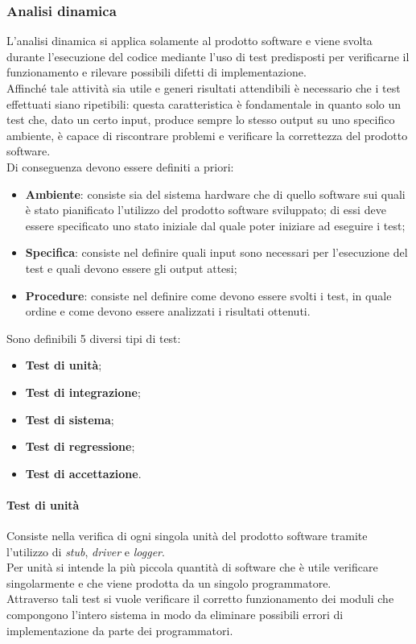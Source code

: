 \subsubsection{Analisi dinamica}
L'analisi dinamica si applica solamente al prodotto software e viene svolta durante l'esecuzione del codice mediante l'uso di test predisposti per verificarne il funzionamento e rilevare possibili difetti di implementazione.\\
Affinché tale attività sia utile e generi risultati attendibili è necessario che i test effettuati siano ripetibili: questa caratteristica è fondamentale in quanto solo un test che, dato un certo input, produce sempre lo stesso output su uno specifico ambiente, è capace di riscontrare problemi e verificare la correttezza del prodotto software.\\
Di conseguenza devono essere definiti a priori:
\begin{itemize}
\item \textbf{Ambiente}: consiste sia del sistema hardware che di quello software sui quali è stato pianificato l'utilizzo del prodotto software sviluppato; di essi deve essere specificato uno stato iniziale dal quale poter iniziare ad eseguire i test;
\item \textbf{Specifica}: consiste nel definire quali input sono necessari per l'esecuzione del test e quali devono essere gli output attesi;
\item \textbf{Procedure}: consiste nel definire come devono essere svolti i test, in quale ordine e come devono essere analizzati i risultati ottenuti.
\end{itemize}
Sono definibili 5 diversi tipi di test: 
\begin{itemize}
\item \textbf{Test di unità};
\item \textbf{Test di integrazione};
\item \textbf{Test di sistema};
\item \textbf{Test di regressione};
\item \textbf{Test di accettazione}.  
\end{itemize}

\paragraph{Test di unità}
Consiste nella verifica di ogni singola unità del prodotto software tramite l'utilizzo di \textit{stub}, \textit{driver} e \textit{logger}.\\
Per unità si intende la più piccola quantità di software che è utile verificare singolarmente e che viene prodotta da un singolo programmatore.\\
Attraverso tali test si vuole verificare il corretto funzionamento dei moduli che compongono l'intero sistema in modo da eliminare possibili errori di implementazione da parte dei programmatori.

